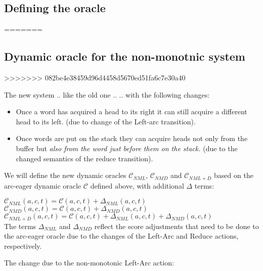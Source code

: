 \documentclass[11pt,letterpaper]{article}
\begin{document}
\subsection{Defining the oracle}
=======
\subsection{Dynamic oracle for the non-monotnic system}
>>>>>>> 082be4e38459d96d4458d5670ed51fa6c7e30a40

The new system .. like the old one ..
.. with the following changes:
\begin{itemize}
   \item Once a word has acquired a head to its right it can still acquire a
      different head to its left.  (due to change of the Left-arc transition).
   \item Once words are put on the stack they can acquire heads not only from
      the buffer but \textit{also from the word just before them on the
      stack.} (due to the changed semantics of the reduce transition).
\end{itemize}

We will define the new dynamic oracles $\mathcal{C}_{NML}$,
$\mathcal{C}_{NMD}$ and $\mathcal{C}_{NML+D}$ based on the arc-eager dynamic
oracle $\mathcal{C}$ defined above, with additional $\Delta$ terms:

\noindent$\mathcal{C}_{NML}(a,c,t) = \mathcal{C}(a,c,t) + \Delta_{NML}(a,c,t)$\\

\noindent$\mathcal{C}_{NMD}(a,c,t) = \mathcal{C}(a,c,t) + \Delta_{NMD}(a,c,t)$\\

\noindent$\mathcal{C}_{NML+D}(a,c,t) = \mathcal{C}(a,c,t) + \Delta_{NML}(a,c,t) + \Delta_{NMD}(a,c,t)$\\

The terms $\Delta_{NML}$ and $\Delta_{NMD}$ reflect the score adjustments that
need to be done to the arc-eager oracle due to the changes of the Left-Arc and
Reduce actions, respectively.

The change due to the non-monotonic Left-Arc action:
\end{document}
